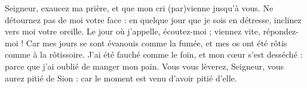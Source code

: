 Seigneur, exaucez ma prière,
et que mon cri (par)vienne jusqu’à vous.
\versseparator
Ne détournez pas de moi votre face :
en quelque jour que je sois en détresse,
inclinez vers moi votre oreille.
\versseparator
Le jour où j'appelle, écoutez-moi ; viennez vite, répondez-moi !
\versseparator
Car mes jours se sont évanouis comme la fumée,
et mes os ont été rôtis comme à la rôtissoire.
\versseparator
J’ai été fauché comme le foin,
et mon cœur s’est desséché :
parce que j’ai oublié de manger mon pain.
\versseparator
Vous vous lèverez, Seigneur, vous aurez pitié de Sion :
car le moment est venu d’avoir pitié d’elle.